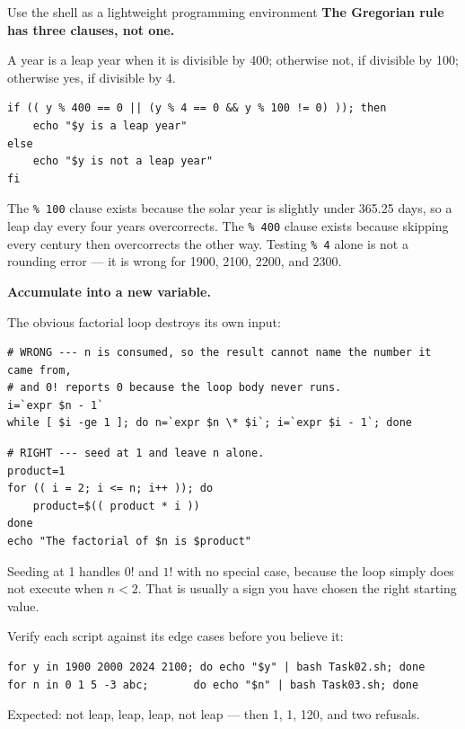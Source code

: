 \begin{labproject}{Use the shell as a lightweight programming environment}
\medskip\noindent\textbf{The Gregorian rule has three clauses, not one.}\par
A year is a leap year when it is divisible by 400; otherwise not, if divisible by 100; otherwise yes, if divisible by 4.

\begin{lstlisting}[style=osbash]
if (( y % 400 == 0 || (y % 4 == 0 && y % 100 != 0) )); then
    echo "$y is a leap year"
else
    echo "$y is not a leap year"
fi
\end{lstlisting}

The \texttt{\% 100} clause exists because the solar year is slightly under 365.25 days, so a leap day every four years overcorrects. The \texttt{\% 400} clause exists because skipping every century then overcorrects the other way. Testing \texttt{\% 4} alone is not a rounding error --- it is wrong for 1900, 2100, 2200, and 2300.

\medskip\noindent\textbf{Accumulate into a new variable.}\par
The obvious factorial loop destroys its own input:

\begin{lstlisting}[style=osbash]
# WRONG --- n is consumed, so the result cannot name the number it came from,
# and 0! reports 0 because the loop body never runs.
i=`expr $n - 1`
while [ $i -ge 1 ]; do n=`expr $n \* $i`; i=`expr $i - 1`; done
\end{lstlisting}

\begin{lstlisting}[style=osbash]
# RIGHT --- seed at 1 and leave n alone.
product=1
for (( i = 2; i <= n; i++ )); do
    product=$(( product * i ))
done
echo "The factorial of $n is $product"
\end{lstlisting}

Seeding at 1 handles $0!$ and $1!$ with no special case, because the loop simply does not execute when $n < 2$. That is usually a sign you have chosen the right starting value.

\begin{tryit}
Verify each script against its edge cases before you believe it:

\begin{lstlisting}[style=osbash]
for y in 1900 2000 2024 2100; do echo "$y" | bash Task02.sh; done
for n in 0 1 5 -3 abc;       do echo "$n" | bash Task03.sh; done
\end{lstlisting}

Expected: not leap, leap, leap, not leap --- then 1, 1, 120, and two refusals.


\end{tryit}
\end{labproject}
